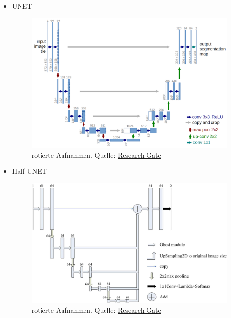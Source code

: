 \documentclass{beamer}
\begin{document}
\begin{frame}[allowframebreaks]
\begin{itemize}
    \item UNET
    \begin{figure}
        \includegraphics[width=0.8\linewidth]{Bilder/UNET_transparent.png}
        \caption{rotierte Aufnahmen. Quelle: \href{https://www.researchgate.net/profile/Blaz-Meden/publication/327635322/figure/fig2/AS:672158246252545@1537266422125/Illustration-of-the-training-data-The-top-row-shows-sample-images-from-the-CASIA.ppm}{Research Gate}}
    \end{figure}
    \item Half-UNET
    \begin{figure}
        \includegraphics[width=0.8\linewidth]{Bilder/halfUNET.png}
        \caption{rotierte Aufnahmen. Quelle: \href{https://www.researchgate.net/publication/361186968/figure/fig3/AS:11431281182545975@1692382952577/The-architecture-of-Half-UNet-The-input-image-size-is-detailed-in-Table-2-The-numbers.tif}{Research Gate}}
    \end{figure}
    \end{itemize}
\end{frame}
\end{document}
